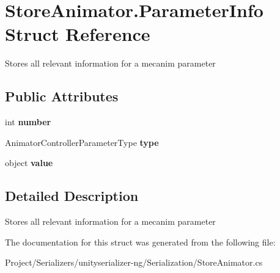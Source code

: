 \hypertarget{struct_store_animator_1_1_parameter_info}{}\section{Store\+Animator.\+Parameter\+Info Struct Reference}
\label{struct_store_animator_1_1_parameter_info}


Stores all relevant information for a mecanim parameter  


\subsection*{Public Attributes}
\begin{DoxyCompactItemize}
\item 
\mbox{\label{struct_store_animator_1_1_parameter_info_aa4c2d2d58cbad01257fdd995d142afd0}} 
int {\bfseries number}
\item 
\mbox{\label{struct_store_animator_1_1_parameter_info_a311235f56b6fe093e9c562ea5ca69e4e}} 
Animator\+Controller\+Parameter\+Type {\bfseries type}
\item 
\mbox{\label{struct_store_animator_1_1_parameter_info_a48c2ae6064ef24653fa3c9c7f275f55e}} 
object {\bfseries value}
\end{DoxyCompactItemize}


\subsection{Detailed Description}
Stores all relevant information for a mecanim parameter 



The documentation for this struct was generated from the following file\+:\begin{DoxyCompactItemize}
\item 
Project/\+Serializers/unityserializer-\/ng/\+Serialization/Store\+Animator.\+cs\end{DoxyCompactItemize}

